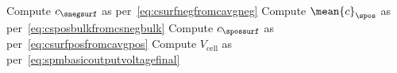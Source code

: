 \begin{algorithm}[!htbp]
\begin{algorithmic}[1]
         
            \State Compute $c_\snegsurf$ as per~\cref{eq:csurfnegfromcavgneg}
            \State Compute $\mean{c}_\spos$ as per~\cref{eq:csposbulkfromcsnegbulk}
            \State Compute $c_\spossurf$ as per~\cref{eq:csurfposfromcavgpos}
            \State Compute $V_\text{cell}$ as per~\cref{eq:spmbasicoutputvoltagefinal}
        \EndOutputEqn%
    \end{algorithmic}
\end{algorithm}
